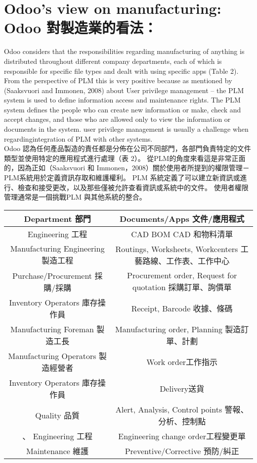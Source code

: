 \section{Odoo’s view on manufacturing: Odoo 對製造業的看法：}


\fontsize{12}{2.5pt}\sectionef 
 {Odoo considers that the responsibilities regarding manufacturing of anything is distributed throughout different company departments, each of which is responsible for
specific file types and dealt with using specific apps (Table 2). From the perspective of PLM this is very positive because as mentioned by (Saaksvuori and Immonen, 2008) about User privilege management – the PLM system is used to define information access and maintenance rights. The PLM system defines the people who can create new information or make, check and accept changes, and those who are allowed only to view the information or documents in the system. user privilege management is usually a challenge when regardingintegration of PLM with other systems.}\\[1pt]

\fontsize{12}{2.5pt}\sectionef  
{Odoo 認為任何產品製造的責任都是分佈在公司不同部門，各部門負責特定的文件類型並使用特定的應用程式進行處理（表 2）。 從PLM的角度來看這是非常正面的，因為正如（Saaksvuori 和 Immonen，2008）關於使用者所提到的權限管理－PLM系統用於定義資訊存取和維護權利。 PLM 系統定義了可以建立新資訊或進行、檢查和接受更改，以及那些僅被允許查看資訊或系統中的文件。 使用者權限管理通常是一個挑戰PLM 與其他系統的整合。}
\\[15pt]


\begin{table}[htbp]
    \centering
    \begin{tabular}{|c|c|}
        \hline
         Department 部門& Documents/Apps 文件/應用程式\\
        \hline
        Engineering  工程& CAD BOM CAD 和物料清單 \\
        Manufacturing Engineering  製造工程& Routings, Worksheets, Workcenters 工藝路線、工作表、工作中心\\
       Purchase/Procurement 採購/採購& Procurement order, Request for quotation 採購訂單、詢價單\\
       Inventory Operators 庫存操作員&Receipt, Barcode 收據、條碼 \\
       Manufacturing Foreman 製造工長& Manufacturing order, Planning 製造訂單、計劃 \\
       Manufacturing Operators 製造經營者& Work order工作指示 \\
       Inventory Operators 庫存操作員& Delivery送貨 \\
       Quality 品質& Alert, Analysis, Control points 警報、分析、控制點\\、
      Engineering  工程& Engineering change order工程變更單 \\
      Maintenance 維護& Preventive/Corrective 預防/糾正\\
        \hline
    \end{tabular}
\end{table}


